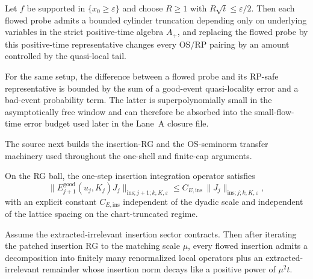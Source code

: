 \begin{lemma}
Let $f$ be supported in $\{x_0\ge \varepsilon\}$ and choose $R\ge 1$ with $R\sqrt t\le \varepsilon/2$. Then each flowed probe admits a bounded cylinder truncation depending only on underlying variables in the strict positive-time algebra $A_+$, and replacing the flowed probe by this positive-time representative changes every OS/RP pairing by an amount controlled by the quasi-local tail.
\end{lemma}

\begin{lemma}
For the same setup, the difference between a flowed probe and its RP-safe representative is bounded by the sum of a good-event quasi-locality error and a bad-event probability term. The latter is superpolynomially small in the asymptotically free window and can therefore be absorbed into the small-flow-time error budget used later in the Lane~A closure file.
\end{lemma}


The source next builds the insertion-RG and the OS-seminorm transfer machinery used throughout the one-shell and finite-cap arguments.

\begin{proposition}
On the RG ball, the one-step insertion integration operator satisfies
\[
\|E^{\mathrm{good}}_{j+1}(u_j,K_j)J_j\|_{\mathrm{ins};j+1;k,K,\varepsilon}
\le C_{E,\mathrm{ins}}\,\|J_j\|_{\mathrm{ins};j;k,K,\varepsilon},
\]
with an explicit constant $C_{E,\mathrm{ins}}$ independent of the dyadic scale and independent of the lattice spacing on the chart-truncated regime.
\end{proposition}

\begin{theorem}
Assume the extracted-irrelevant insertion sector contracts. Then after iterating the patched insertion RG to the matching scale $\mu$, every flowed insertion admits a decomposition into finitely many renormalized local operators plus an extracted-irrelevant remainder whose insertion norm decays like a positive power of $\mu^2t$.
\end{theorem}

